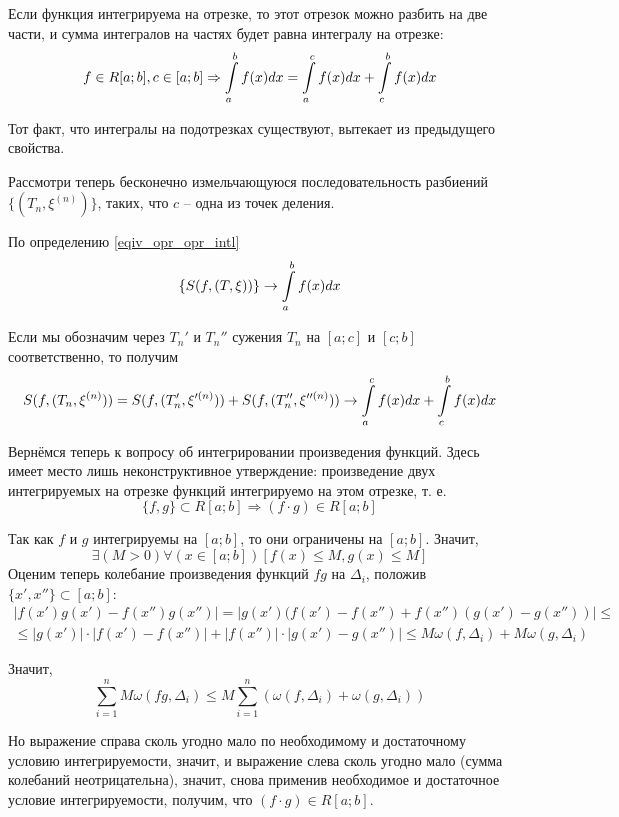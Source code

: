 \dokno

Если функция интегрируема на отрезке, то этот отрезок можно разбить на две части, и сумма интегралов на частях будет равна интегралу на отрезке:
$$
f\in R[a;b], c\in [a;b] \Rightarrow \int\limits_a^b f(x)dx = \int\limits_a^c f(x) dx + \int\limits_c^b f(x) dx
$$

\dokvo

Тот факт, что интегралы на подотрезках существуют, вытекает из предыдущего свойства.

Рассмотри теперь бесконечно измельчающуюся последовательность разбиений $\{(T_n,\xi^{(n)})\}$, таких, что $c$ -- одна из точек деления.

По определению \ref{eqiv_opr_opr_intl} 
$$
\{S(f,(T,\xi))\} \to \int\limits_a^b f(x) dx
$$

Если мы обозначим через $T_n'$ и $T_n''$ сужения $T_n$ на $[a;c]$ и $[c;b]$ соответственно, то получим
$$
S(f,(T_n,\xi^{(n)}))=S(f,(T_n',\xi'^{(n)}))+S(f,(T_n'',\xi''^{(n)}))\to \int\limits_a^c f(x) dx + \int\limits_c^b f(x) dx
$$

\dokno

Вернёмся теперь к вопросу об интегрировании произведения функций.
Здесь имеет место лишь неконструктивное утверждение: произведение двух интегрируемых на отрезке функций интегрируемо на этом отрезке, т. е.
$$
\{f,g\}\subset R[a;b] \Rightarrow (f\cdot g)\in R[a;b]
$$

\dokvo

Так как $f$ и $g$ интегрируемы на $[a;b]$, то они ограничены на $[a;b]$.
Значит,
$$
\exists(M>0)\forall(x\in[a;b])[f(x)\leq M, g(x)\leq M]
$$
Оценим теперь колебание произведения функций $fg$ на $\Delta_i$, положив $\{x',x''\}\subset[a;b]$:
\begin{multline*}
|f(x')g(x')-f(x'')g(x'')|=
|g(x')(f(x')-f(x'')+f(x'')(g(x')-g(x''))|\leq
\\\leq
|g(x')|\cdot|f(x')-f(x'')|+|f(x'')|\cdot|g(x')-g(x'')|\leq
M\omega(f,\Delta_i)+M\omega(g,\Delta_i)
\end{multline*}

Значит,
$$
\sum_{i=1}^n M\omega(fg,\Delta_i) \leq M \sum_{i=1}^n \left( \omega(f,\Delta_i) + \omega(g,\Delta_i) \right)
$$

Но выражение справа сколь угодно мало по необходимому и достаточному условию интегрируемости, значит, и выражение слева сколь угодно мало (сумма колебаний неотрицательна), значит, снова применив необходимое и достаточное условие интегрируемости, получим, что $(f\cdot g)\in R[a;b]$.

\dokno

